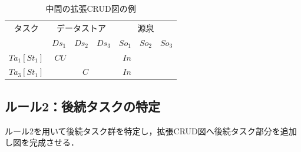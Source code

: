 \begin{table}[t]
  \centering
  \caption{中間の拡張CRUD図の例}
    \begin{tabular}{r|r|r|r|r|r|r}
    \multicolumn{1}{c|}{タスク} & \multicolumn{3}{c|}{データストア} & \multicolumn{3}{c}{源泉} \\
\cline{2-7}    \multicolumn{1}{c|}{} & $Ds_1$ & $Ds_2$ & $Ds_3$ & $So_1$ & $So_2$ & $So_3$ \\
    \hline
    \hline
    $Ta_1[St_1]$ & $CU$ &   &   & $In$ &   &  \\
    \hline
    $Ta_3[St_1]$ &   & $C$ &   & $In$ &   &  \\
    \hline
    \end{tabular}%
 \label{CRUDIO2}
\end{table}%



\subsection{ルール2：後続タスクの特定}
ルール2を用いて後続タスク群を特定し，拡張CRUD図へ後続タスク部分を追加し図を完成させる．

